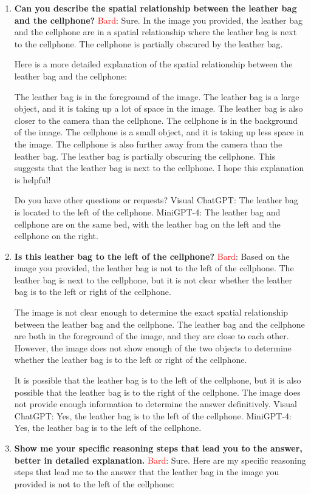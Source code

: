 \begin{enumerate}
    \item \textbf{Can you describe the spatial relationship between the leather bag and the cellphone?}
    \subitem \textcolor{Red}{Bard}: 
    Sure. In the image you provided, the leather bag and the cellphone are in a spatial relationship where the leather bag is next to the cellphone. The cellphone is partially obscured by the leather bag.
    
    Here is a more detailed explanation of the spatial relationship between the leather bag and the cellphone:
    
    The leather bag is in the foreground of the image. The leather bag is a large object, and it is taking up a lot of space in the image. The leather bag is also closer to the camera than the cellphone.
    The cellphone is in the background of the image. The cellphone is a small object, and it is taking up less space in the image. The cellphone is also further away from the camera than the leather bag.
    The leather bag is partially obscuring the cellphone. This suggests that the leather bag is next to the cellphone.
    I hope this explanation is helpful!
    
    Do you have other questions or requests?
    \subitem Visual ChatGPT: The leather bag is located to the left of the cellphone.
    \subitem MiniGPT-4: The leather bag and cellphone are on the same bed, with the leather bag on the left and the cellphone on the right.
    \item \textbf{Is this leather bag to the left of the cellphone?}
    \subitem \textcolor{Red}{Bard}:
    Based on the image you provided, the leather bag is not to the left of the cellphone. The leather bag is next to the cellphone, but it is not clear whether the leather bag is to the left or right of the cellphone.

    The image is not clear enough to determine the exact spatial relationship between the leather bag and the cellphone. The leather bag and the cellphone are both in the foreground of the image, and they are close to each other. However, the image does not show enough of the two objects to determine whether the leather bag is to the left or right of the cellphone.

    It is possible that the leather bag is to the left of the cellphone, but it is also possible that the leather bag is to the right of the cellphone. The image does not provide enough information to determine the answer definitively.
    \subitem Visual ChatGPT: Yes, the leather bag is to the left of the cellphone.
    \subitem MiniGPT-4: Yes, the leather bag is to the left of the cellphone.
    \item \textbf{Show me your specific reasoning steps that lead you to the answer, better in detailed explanation.}
    \subitem \textcolor{Red}{Bard}: Sure. Here are my specific reasoning steps that lead me to the answer that the leather bag in the image you provided is not to the left of the cellphone:


\end{enumerate}
